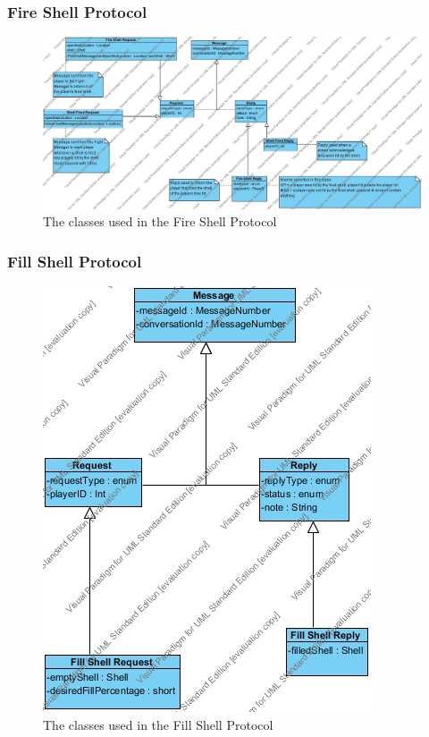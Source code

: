\documentclass[12pt]{article}
\begin{document}
			\subsubsection{Fire Shell Protocol}
				\begin{center}
					\begin{figure}[htp]
						\centering
						\includegraphics[width=\textwidth]{Diagrams/Class Diagrams/Fire Shell Protocol.jpg}
						\caption{The classes used in the Fire Shell Protocol}
					\end{figure}
				\end{center}
				\newpage
				\subsubsection{Fill Shell Protocol}
					\begin{center}
						\begin{figure}[htp]
							\centering
							\includegraphics[width=.7\textwidth]{Diagrams/Class Diagrams/Fill Shell Protocol.jpg}
							\caption{The classes used in the Fill Shell Protocol}
						\end{figure}
					\end{center}
				\newpage
\end{document}
